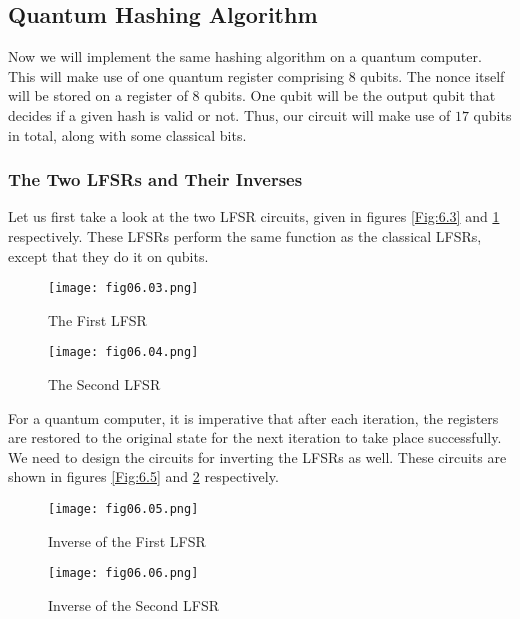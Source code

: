 \subsection{Quantum Hashing Algorithm}
Now we will implement the same hashing algorithm on a quantum computer. This will make use of one quantum register comprising $8$ qubits. The nonce itself will be stored on a register of 8 qubits. One qubit will be the output qubit that decides if a given hash is valid or not. Thus, our circuit will make use of $17$ qubits in total, along with some classical bits.  
\subsubsection*{The Two LFSRs and Their Inverses}
Let us first take a look at the two LFSR circuits, given in figures \ref{Fig:6.3} and \ref{Fig:6.4} respectively. These LFSRs perform the same function as the classical LFSRs, except that they do it on qubits.
\begin{figure}[!htb]
   \begin{minipage}{\textwidth}
     \centering
     \texttt{[image: fig06.03.png]}
     \caption{The First LFSR}
     \label{Fig:6.3}
   \end{minipage}
   \begin{minipage}{\textwidth}
     \centering
     \texttt{[image: fig06.04.png]}
     \caption{The Second LFSR}
     \label{Fig:6.4}
   \end{minipage}
\end{figure}

For a quantum computer, it is imperative that after each iteration, the registers are restored to the original state for the next iteration to take place successfully. We need to design the circuits for inverting the LFSRs as well. These circuits are shown in figures \ref{Fig:6.5} and \ref{Fig:6.6} respectively.
\begin{figure}[!htb]
   \begin{minipage}{\textwidth}
     \centering
     \texttt{[image: fig06.05.png]}
     \caption{Inverse of the First LFSR}
     \label{Fig:6.5}
   \end{minipage}
   \begin{minipage}{\textwidth}
     \centering
     \texttt{[image: fig06.06.png]}
     \caption{Inverse of the Second LFSR}
     \label{Fig:6.6}
   \end{minipage}
\end{figure}

